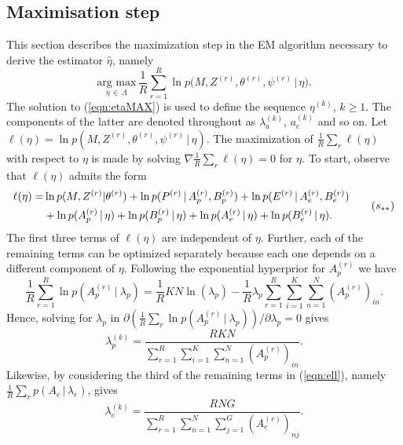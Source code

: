 \documentclass[11pt]{amsart}
\theoremstyle{definition}
\theoremstyle{remark}
\begin{document}
\subsection{Maximisation step}
This section describes the maximization step in the EM algorithm
necessary to derive the estimator $\hat\eta$, namely
\begin{equation}
   \label{eqn:etaMAX}
    \underset{\eta\,\in\,\Lambda}{\text{arg max}}\,
    \frac{1}{R}\sum_{r=1}^R \ln p\big(M, Z^{(r)}, \theta^{(r)},
    \psi^{(r)}\,|\, \eta\big). \tag{$s_*$}
\end{equation}
The solution to (\ref{eqn:etaMAX}) is used to define the sequence
$\eta^{(k)}$, $k \geq 1$. The components of the latter are denoted
throughout as $\lambda_a^{(k)}$, $a_e^{(k)}$ and so on.  Let
$\ell(\eta) = \ln p(M, Z^{(r)}, \theta^{(r)}, \psi^{(r)}\,|\,
\eta)$. The maximization of $\frac{1}{R}\sum_{r}\ell(\eta)$ with
respect to $\eta$ is made by solving
$\nabla\frac{1}{R}\sum_{r}\ell(\eta) = 0$ for $\eta$.  To start,
observe that $\ell(\eta)$ admits the form
\begin{equation}
 \label{eqn:ell}
 \begin{aligned}
  \ell(\eta)
  =&
  \ln p(M, Z^{(r)} | \theta^{(r)})  + \ln p(P^{(r)}\,|\, A_p^{(r)},
  B_p^{(r)}) + \ln p(E^{(r)}\,|\, A_e^{(r)},  B_e^{(r)})  \\
  &+
  \ln p(A_p^{(r)}\,|\, \eta) + \ln p(B_p^{(r)}\,|\, \eta) +
  \ln p(A_e^{(r)}\,|\, \eta) + \ln p(B_e^{(r)}\,|\, \eta).
 \end{aligned}
 \tag{$s_{**}$}
\end{equation}
The first three terms of $\ell(\eta)$ are independent of
$\eta$. Further, each of the remaining terms can be optimized
separately because each one depends on a different component of
$\eta$. Following the exponential hyperprior for $A_p^{(r)}$ we have
\[
   \frac{1}{R}\sum_{r=1}^R \ln  p(A_p^{(r)}\,|\ \lambda_p)
  = 
  \frac{1}{R}KN\ln(\lambda_p) - \frac{1}{R}\lambda_p\sum_{r=1}^R
  \sum_{i=1}^K\sum_{n=1}^N (A_p^{(r)})_{in}.
\]
Hence, solving for $\lambda_p$ in $\partial (\frac{1}{R}\sum_r \ln
p(A_p^{(r)}\,|\ \lambda_p))/\partial\lambda_p = 0$ gives
\[
  \lambda_p^{(k)} = \frac{RKN}{\sum_{r=1}^R \sum_{i=1}^K 
    \sum_{n=1}^N (A_p^{(r)})_{in}}.
\]
Likewise, by considering the third of the remaining terms in
(\ref{eqn:ell}), namely $\frac{1}{R} \sum_r 
p(A_e\,|\, \lambda_e)$, gives
\[
  \lambda_e^{(k)} = \frac{RNG}{\sum_{r=1}^R \sum_{n=1}^N
    \sum_{j=1}^G (A_e^{(r)})_{nj}}.
\]
\end{document}
